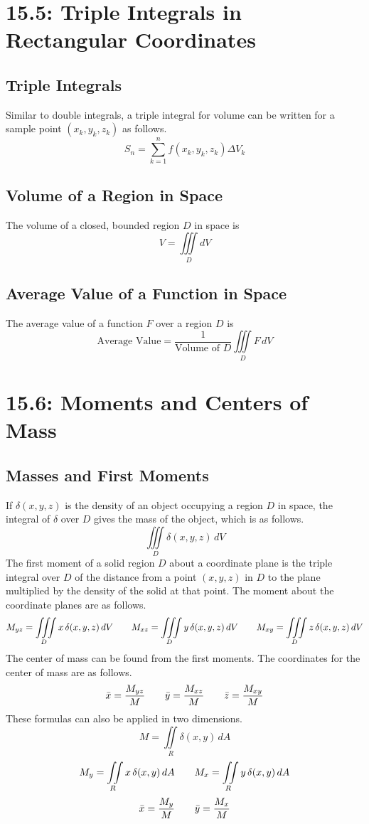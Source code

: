 \documentclass{article}
\begin{document}
\section*{15.5: Triple Integrals in Rectangular Coordinates}
\subsection*{Triple Integrals}
Similar to double integrals, a triple integral for volume can be written for a sample point \((x_k, y_k, z_k)\) as follows.
\[S_n = \sum_{k=1}^{n}f(x_k, y_k, z_k)\Delta V_k\]
\subsection*{Volume of a Region in Space}
The volume of a closed, bounded region \(D\) in space is
\[V = \iiint\limits_D dV\]
\subsection*{Average Value of a Function in Space}
The average value of a function \(F\) over a region \(D\) is
\[\text{Average Value} = \frac{1}{\text{Volume of }D}\iiint\limits_DF\,dV\]
\section*{15.6: Moments and Centers of Mass}
\subsection*{Masses and First Moments}
If \(\delta(x,y,z)\) is the density of an object occupying a region \(D\) in space, the integral of \(\delta\) over \(D\) gives the mass of the object, which is as follows.
\[\iiint\limits_D\delta(x,y,z)\,dV\]
The first moment of a solid region \(D\) about a coordinate plane is the triple integral over \(D\) of the distance from a point \((x, y, z)\) in \(D\) to the plane multiplied by the density of the solid at that point. The moment about the coordinate planes are as follows.
\[M_{yz}=\iiint\limits_Dx\,\delta(x,y,z)\,dV\hspace{7 mm}M_{xz}=\iiint\limits_Dy\,\delta(x,y,z)\,dV\hspace{7 mm}M_{xy}=\iiint\limits_Dz\,\delta(x,y,z)\,dV\]
The center of mass can be found from the first moments. The coordinates for the center of mass are as follows.
\[\bar{x}=\frac{M_{yz}}{M}\hspace{7 mm}\bar{y}=\frac{M_{xz}}{M}\hspace{7 mm}\bar{z}=\frac{M_{xy}}{M}\]
These formulas can also be applied in two dimensions.
\[M=\iint\limits_R\delta(x,y)\,dA\]
\[M_y=\iint\limits_Rx\,\delta(x,y)\,dA\hspace{7 mm}M_x=\iint\limits_Ry\,\delta(x,y)\,dA\]
\[\bar{x}=\frac{M_y}{M}\hspace{7 mm}\bar{y}=\frac{M_x}{M}\]
\end{document}
